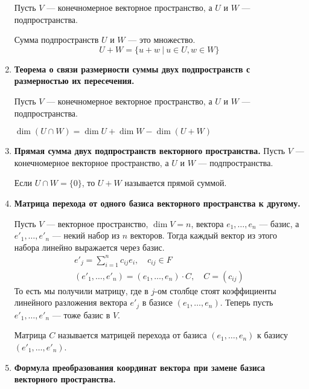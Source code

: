 \begin{enumerate}
Пусть $V$ --- конечномерное векторное пространство, а $U$ и $W$ --- подпространства.

Сумма подпространств $U$ и $W$ --- это множество.
\[
U+W = \{u + w\ |\ u \in U, w \in W\}
\]
\item \textbf{Теорема о связи размерности суммы двух подпространств с размерностью их пересечения.}

Пусть $V$ --- конечномерное векторное пространство, а $U$ и $W$ --- подпространства.

$\dim \left(U \cap W\right) = \dim U + \dim W - \dim \left(U+W\right)$
\item \textbf{Прямая сумма двух подпространств векторного пространства.}
Пусть $V$ --- конечномерное векторное пространство, а $U$ и $W$ --- подпространства.

Если $U \cap W = \{0\}$, то $U + W$ называется прямой суммой.
\item \textbf{Матрица перехода от одного базиса векторного пространства к другому.}

Пусть $V$ --- векторное пространство, $\dim V = n$, вектора $e_1, \ldots, e_n$ --- базис, а $e'_1, \ldots, e'_n$ --- некий набор из $n$ векторов. Тогда каждый вектор из этого набора линейно выражается через базис.
\begin{gather*}
e'_j = \sum_{i = 1}^{n} c_{ij}e_i, \quad c_{ij} \in F \\
(e'_1, \ldots, e'_n) = (e_1, \ldots, e_n) \cdot C, \quad C = (c_{ij})
\end{gather*}
То есть мы получили матрицу, где в $j$-ом столбце стоят коэффициенты линейного разложения вектора $e'_j$ в базисе $(e_1, \ldots, e_n)$. Теперь пусть $e'_1, \ldots, e'_n$ --- тоже базис в $V$.

Матрица $C$ называется матрицей перехода от базиса $(e_1, \ldots, e_n)$ к базису $(e'_1, \ldots, e'_n)$.
\item \textbf{Формула преобразования координат вектора при замене базиса векторного пространства.}



\end{enumerate}
